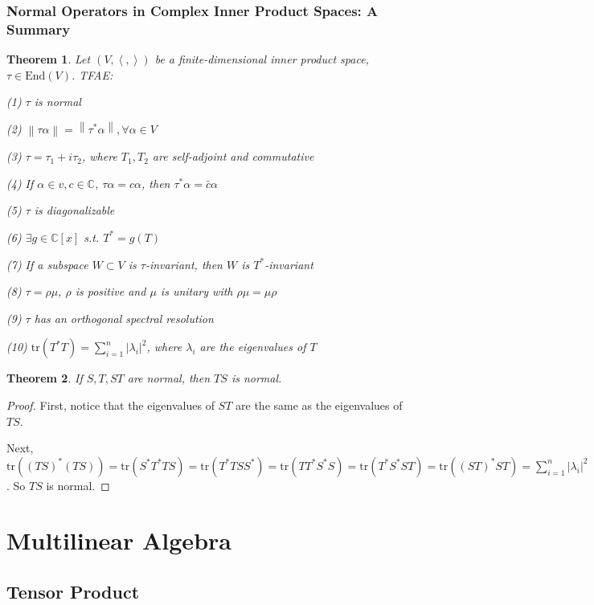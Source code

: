 \documentclass{book}
\newtheorem{theorem}{Theorem}[section]
\theoremstyle{definition}
\begin{document}
\subsection{Normal Operators in Complex Inner Product Spaces: A Summary}
\begin{theorem}
    Let $(V,\left\langle,\right\rangle)$ be a finite-dimensional inner product space, $\tau\in \text{End}(V)$. TFAE:\par
(1) $\tau$ is normal \par
(2) $\left\|\tau \alpha \right\|=\left\|\tau^*\alpha\right\|,\forall\alpha\in V$\par
(3) $\tau=\tau_1+i\tau_2$, where $T_1,T_2$ are self-adjoint and commutative\par
(4) If $\alpha\in v,c\in \mathbb{C}$, $\tau\alpha=c\alpha$, then $\tau^*\alpha=\bar{c}\alpha$\par
(5) $\tau$ is diagonalizable\par
(6) $\exists g\in\mathbb{C}[x]$ s.t. $T^*=g(T)$\par
(7) If a subspace $W\subset V$ is $\tau$-invariant, then $W$ is $T^*$-invariant\par
(8) $\tau=\rho\mu$, $\rho$ is positive and $\mu$ is unitary with $\rho\mu=\mu\rho$\par
(9) $\tau$ has an orthogonal spectral resolution\par
(10) $\text{tr}(T^*T)=\sum_{i=1}^n \left|\lambda_i\right|^2$, where $\lambda_i$ are the eigenvalues of $T$
\end{theorem}
\begin{theorem}
    If $S,T,ST$ are normal, then $TS$ is normal.
\end{theorem}
\begin{proof}
    First, notice that the eigenvalues of $ST$ are the same as the eigenvalues of $TS$.\par
    Next, $\text{tr}((TS)^*(TS))=\text{tr}(S^*T^*TS)=\text{tr}(T^*TSS^*)=\text{tr}(TT^*S^*S)=\text{tr}(T^*S^*ST)=\text{tr}((ST)^*ST)=\sum_{i=1}^n\left|\lambda_i\right|^2$.
So $TS$ is normal.
\end{proof}



\chapter{Multilinear Algebra}
\section{Tensor Product}
\end{document}
